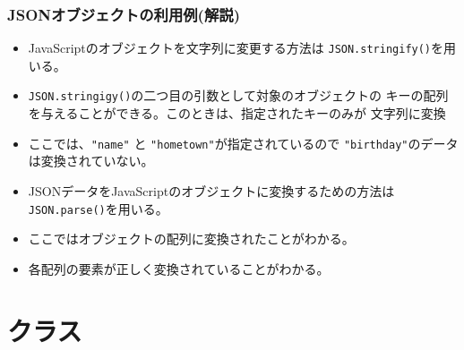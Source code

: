 \begin{frame}[containsverbatim]
 \frametitle{JSONオブジェクトの利用例(解説)}
\begin{itemize}
 \item JavaScriptのオブジェクトを文字列に変更する方法は
       \texttt{JSON.stringify()}を用いる。
 \item \texttt{JSON.stringigy()}の二つ目の引数として対象のオブジェクトの
       キーの配列を与えることができる。このときは、指定されたキーのみが
       文字列に変換
 \item ここでは、\verb+"name"+ と \verb+"hometown"+が指定されているので
\verb+"birthday"+のデータは変換されていない。
 \item JSONデータをJavaScriptのオブジェクトに変換するための方法は
       \texttt{JSON.parse()}を用いる。
 \item ここではオブジェクトの配列に変換されたことがわかる。
 \item 各配列の要素が正しく変換されていることがわかる。
\end{itemize}
\end{frame}
\section{クラス}
